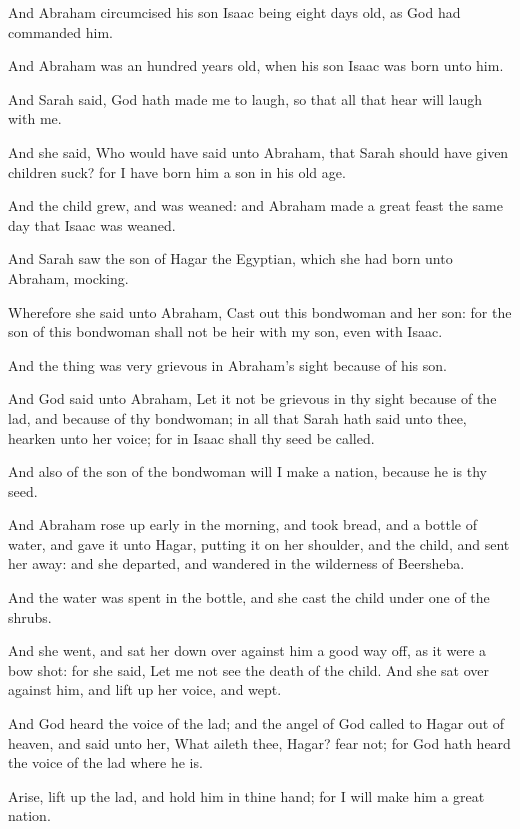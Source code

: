 \verse And Abraham circumcised his son Isaac being eight days old, as God had commanded him.

\verse And Abraham was an hundred years old, when his son Isaac was born unto him.

\verse And Sarah said, God hath made me to laugh, so that all that hear will laugh with me.

\verse And she said, Who would have said unto Abraham, that Sarah should have given children suck? for I have born him a son in his old age.

\verse And the child grew, and was weaned: and Abraham made a great feast the same day that Isaac was weaned.

\verse And Sarah saw the son of Hagar the Egyptian, which she had born unto Abraham, mocking.

\verse Wherefore she said unto Abraham, Cast out this bondwoman and her son: for the son of this bondwoman shall not be heir with my son, even with Isaac.

\verse And the thing was very grievous in Abraham's sight because of his son.

\verse And God said unto Abraham, Let it not be grievous in thy sight because of the lad, and because of thy bondwoman; in all that Sarah hath said unto thee, hearken unto her voice; for in Isaac shall thy seed be called.

\verse And also of the son of the bondwoman will I make a nation, because he is thy seed.

\verse And Abraham rose up early in the morning, and took bread, and a bottle of water, and gave it unto Hagar, putting it on her shoulder, and the child, and sent her away: and she departed, and wandered in the wilderness of Beersheba.

\verse And the water was spent in the bottle, and she cast the child under one of the shrubs.

\verse And she went, and sat her down over against him a good way off, as it were a bow shot: for she said, Let me not see the death of the child. And she sat over against him, and lift up her voice, and wept.

\verse And God heard the voice of the lad; and the angel of God called to Hagar out of heaven, and said unto her, What aileth thee, Hagar?  fear not; for God hath heard the voice of the lad where he is.

\verse Arise, lift up the lad, and hold him in thine hand; for I will make him a great nation.

